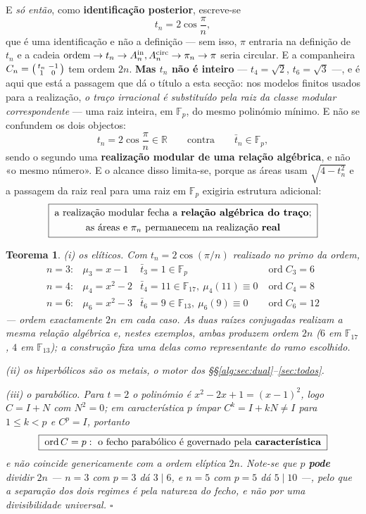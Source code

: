\documentclass[11pt,a4paper]{article}
\newtheorem{teorema}{Teorema}
\begin{document}
\noindent E \emph{só então}, como \textbf{identificação posterior}, escreve-se
\[
t_n=2\cos\frac{\pi}{n},
\]
que é uma identificação e não a definição --- sem isso, $\pi$ entraria na
definição de $t_n$ e a cadeia
$\text{ordem}\to t_n\to A_n^{\rm in},A_n^{\rm circ}\to\pi_n\to\pi$
seria circular. E a companheira
$C_n=\begin{psmallmatrix}t_n&-1\\1&0\end{psmallmatrix}$ tem ordem $2n$. \textbf{Mas $t_n$ não é inteiro} --- $t_4=\sqrt2$, $t_6=\sqrt3$ ---,
e é aqui que está a passagem que dá o título a esta secção: nos modelos finitos
usados para a realização, \emph{o traço irracional é substituído pela raiz da
classe modular correspondente} --- uma raiz inteira, em $\mathbb{F}_p$, do mesmo
polinómio mínimo. E não se confundem os dois objectos:
\[
t_n=2\cos\frac{\pi}{n}\in\mathbb{R}
\qquad\text{contra}\qquad
\bar t_n\in\mathbb{F}_p ,
\]
sendo o segundo uma \textbf{realização modular de uma relação algébrica}, e não
«o mesmo número». E o alcance disso limita-se, porque as áreas usam
$\sqrt{4-t_n^{2}}$ e a passagem da raiz real para uma raiz em $\mathbb{F}_p$ exigiria
estrutura adicional:
\[
\boxed{\;\begin{gathered}
\text{a realização modular fecha a \textbf{relação algébrica do traço};}\\
\text{as áreas e }\pi_n\text{ permanecem na realização \textbf{real}}
\end{gathered}\;}
\]

\begin{teorema}\label{thm:pi}
\emph{(i) os elíticos.} Com $t_n=2\cos(\pi/n)$ realizado no primo da ordem,
\[
\begin{array}{llll}
n=3: & \mu_3=x-1 & \bar t_3=1\in\mathbb{F}_p & \operatorname{ord}C_3=6\\
n=4: & \mu_4=x^{2}-2 & \bar t_4=11\in\mathbb{F}_{17},\ \mu_4(11)\equiv0
     & \operatorname{ord}C_4=8\\
n=6: & \mu_6=x^{2}-3 & \bar t_6=9\in\mathbb{F}_{13},\ \mu_6(9)\equiv0
     & \operatorname{ord}C_6=12
\end{array}
\]
--- ordem exactamente $2n$ em cada caso. As duas raízes conjugadas realizam a
\emph{mesma relação algébrica} e, nestes exemplos, ambas produzem ordem $2n$ ($6$
em $\mathbb{F}_{17}$, $4$ em $\mathbb{F}_{13}$); a construção fixa uma delas como
representante do ramo escolhido.

\emph{(ii) os hiperbólicos} são os metais, o motor dos
\S\S\ref{alg:sec:dual}--\ref{sec:todos}.

\emph{(iii) o parabólico.} Para $t=2$ o polinómio é $x^{2}-2x+1=(x-1)^{2}$, logo
$C=I+N$ com $N^{2}=0$; em característica $p$ ímpar $C^{k}=I+kN\neq I$ para
$1\leq k<p$ e $C^{p}=I$, portanto
\[
\boxed{\;\operatorname{ord}C=p:\ \text{o fecho parabólico é governado pela
\textbf{característica}}\;}
\]
e \emph{não} coincide genericamente com a ordem elíptica $2n$. Note-se que $p$
\textbf{pode} dividir $2n$ --- $n=3$ com $p=3$ dá $3\mid6$, e $n=5$ com $p=5$ dá
$5\mid10$ ---, pelo que a separação dos dois regimes é pela \emph{natureza do
fecho}, e não por uma divisibilidade universal. $\square$
\end{teorema}
\end{document}
